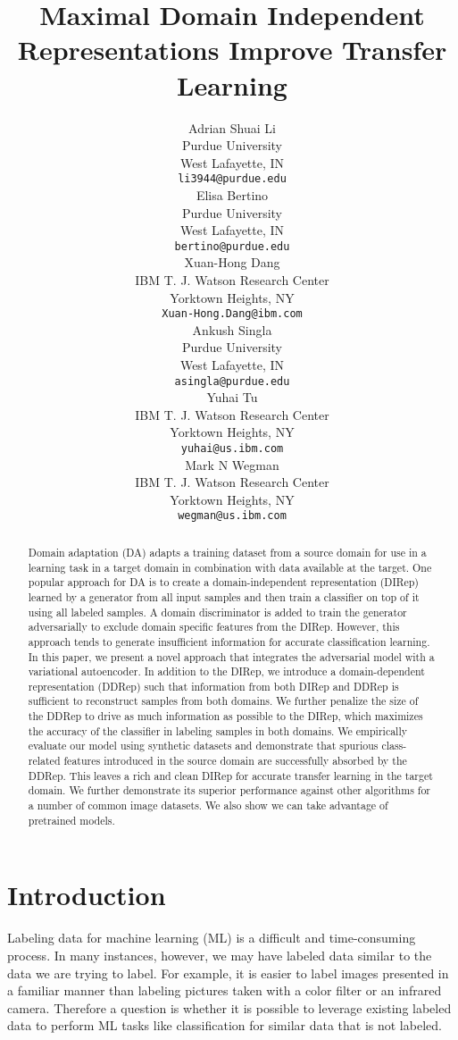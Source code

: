 \documentclass{article}
\title{Maximal Domain Independent Representations Improve Transfer Learning}
\author{%
  Adrian Shuai Li \\
  Purdue University\\
  West Lafayette, IN \\
  \texttt{li3944@purdue.edu} \\
  \And
  Elisa Bertino \\
Purdue University\\
  West Lafayette, IN \\
  \texttt{bertino@purdue.edu} \\
  \AND
  Xuan-Hong Dang \\
  IBM T. J. Watson Research Center \\
  Yorktown Heights, NY \\
  \texttt{Xuan-Hong.Dang@ibm.com} \\
  \And
  Ankush Singla \\
  Purdue University \\
  West Lafayette, IN \\
  \texttt{asingla@purdue.edu} \\
  \And
  Yuhai Tu \\
  IBM T. J. Watson Research Center \\
  Yorktown Heights, NY \\
  \texttt{yuhai@us.ibm.com} \\
  \And
  Mark N Wegman \\
 IBM T. J. Watson Research Center \\
  Yorktown Heights, NY \\
  \texttt{wegman@us.ibm.com} \\
}
\newcommand{\elisa}[1]{\textbf{\color{red}Elisa: #1}}
\begin{document}
\maketitle


\begin{abstract}
  
  Domain adaptation (DA) adapts a training dataset from a source domain for use in a learning task in a target domain in combination with data available at the target. One popular approach for DA is to create a domain-independent representation (DIRep) learned by a generator from all input samples and then train a classifier on top of it using all labeled samples. A domain discriminator is added to train the generator adversarially to exclude domain specific features from the DIRep. However, this approach tends to generate insufficient information for accurate classification learning. In this paper, we present a novel approach that integrates the adversarial model with a variational autoencoder. In addition to the DIRep, we introduce a domain-dependent representation (DDRep) such that information from both DIRep and DDRep is sufficient to reconstruct samples from both domains. We further penalize the size of the DDRep to drive as much information as possible to the DIRep, which maximizes the accuracy of the classifier in labeling samples in both domains. We empirically evaluate our model using synthetic datasets and demonstrate that spurious class-related features introduced in the source domain are successfully absorbed by the DDRep. This leaves a rich and clean DIRep for accurate transfer learning in the target domain. We further demonstrate its superior performance against other algorithms for a number of common image datasets. We also show we can take advantage of pretrained models.
\end{abstract}

\section{Introduction}
\label{Introduction}
%


Labeling data for machine learning (ML) is a difficult and time-consuming process. In many instances, however, we may have labeled data similar to the data we are trying to label. %
For example, it is easier to label images presented in a familiar manner than labeling pictures taken with a color filter or an infrared camera. Therefore a question is whether it is possible to leverage existing labeled data to perform ML tasks like classification for similar data that is not labeled. 
\end{document}

